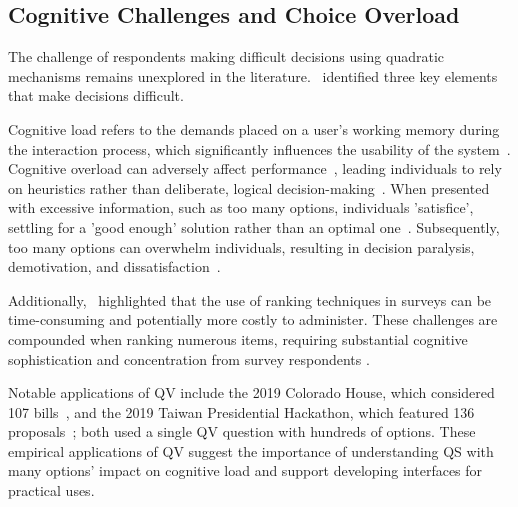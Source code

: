 \subsection{Cognitive Challenges and Choice Overload}
The challenge of respondents making difficult decisions using quadratic mechanisms remains unexplored in the literature.~\citet{lichtensteinConstructionPreference2006} identified three key elements that make decisions difficult. 

Cognitive load refers to the demands placed on a user's working memory during the interaction process, which significantly influences the usability of the system~\cite{cooper1998research, seppCognitiveLoadTheory2019}. Cognitive overload can adversely affect performance~\cite{drommi2001interface}, leading individuals to rely on heuristics rather than deliberate, logical decision-making~\cite{daniel2017thinking}. When presented with excessive information, such as too many options, individuals 'satisfice', settling for a 'good enough' solution rather than an optimal one~\cite{simonBehavioralModelRational1955, payneAdaptiveStrategySelection1988, tverskyJudgmentsRepresentativeness}. Subsequently, too many options can overwhelm individuals, resulting in decision paralysis, demotivation, and dissatisfaction~\cite{iyengarWhenChoiceDemotivating2000}.

Additionally,~\citet{alwinMeasurementValuesSurveys1985} highlighted that the use of ranking techniques in surveys can be time-consuming and potentially more costly to administer. These challenges are compounded when ranking numerous items, requiring substantial cognitive sophistication and concentration from survey respondents \cite{featherMeasurementValuesEffects1973}.

Notable applications of QV include the 2019 Colorado House, which considered 107 bills~\cite{coyNewWayVoting2019}, and the 2019 Taiwan Presidential Hackathon, which featured 136 proposals~\cite{QuadraticVotingFrontend2022}; both used a single QV question with hundreds of options. These empirical applications of QV suggest the importance of understanding QS with many options' impact on cognitive load and support developing interfaces for practical uses.